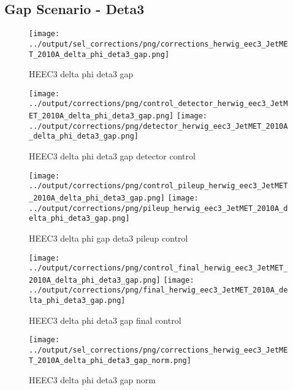 \documentclass[11pt]{book}
\begin{document}
\subsection{Gap Scenario - Deta3}

\begin{figure}[ht]
\centering
\texttt{[image: ../output/sel\_corrections/png/corrections\_herwig\_eec3\_JetMET\_2010A\_delta\_phi\_deta3\_gap.png]}
\caption{HEEC3 delta phi deta3 gap}
\label{fig:HEEC3_JetMET_2010A_delta_phi_deta3_gap}
\end{figure}

\begin{figure}[ht]
\centering
\texttt{[image: ../output/corrections/png/control\_detector\_herwig\_eec3\_JetMET\_2010A\_delta\_phi\_deta3\_gap.png]}
\texttt{[image: ../output/corrections/png/detector\_herwig\_eec3\_JetMET\_2010A\_delta\_phi\_deta3\_gap.png]}
\caption{HEEC3 delta phi deta3 gap detector control}
\label{fig:HEEC3_JetMET_2010A_delta_phi_deta3_gap_detector_control}
\end{figure}

\begin{figure}[ht]
\centering
\texttt{[image: ../output/corrections/png/control\_pileup\_herwig\_eec3\_JetMET\_2010A\_delta\_phi\_deta3\_gap.png]}
\texttt{[image: ../output/corrections/png/pileup\_herwig\_eec3\_JetMET\_2010A\_delta\_phi\_deta3\_gap.png]}
\caption{HEEC3 delta phi gap deta3 pileup control}
\label{fig:HEEC3_JetMET_2010A_delta_phi_deta3_gap_pileup_control}
\end{figure}


\begin{figure}[ht]
\centering
\texttt{[image: ../output/corrections/png/control\_final\_herwig\_eec3\_JetMET\_2010A\_delta\_phi\_deta3\_gap.png]}
\texttt{[image: ../output/corrections/png/final\_herwig\_eec3\_JetMET\_2010A\_delta\_phi\_deta3\_gap.png]}
\caption{HEEC3 delta phi deta3 gap final control}
\label{fig:HEEC3_JetMET_2010A_delta_phi_deta3_gap_final_control}
\end{figure}


\begin{figure}[ht]
\centering
\texttt{[image: ../output/sel\_corrections/png/corrections\_herwig\_eec3\_JetMET\_2010A\_delta\_phi\_deta3\_gap\_norm.png]}
\caption{HEEC3 delta phi deta3 gap norm}
\label{fig:HEEC3_JetMET_2010A_delta_phi_deta3_gap_norm}
\end{figure}
\end{document}

